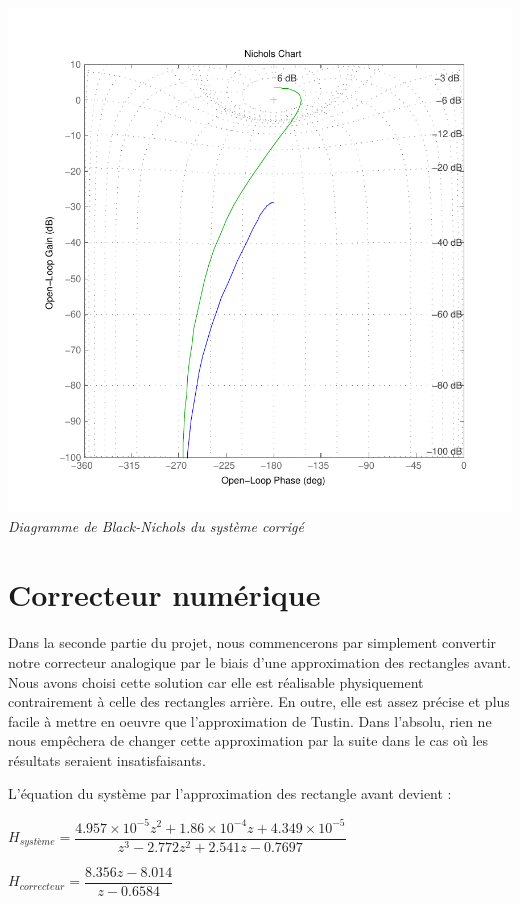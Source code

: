 \documentclass[11pt, french]{article} %
\begin{document}
\begin{center}
\includegraphics[scale=0.50]{MatBlack.pdf}
\\
\emph{Diagramme de Black-Nichols du système corrigé}
\end{center}

\section{Correcteur numérique}

Dans la seconde partie du projet, nous commencerons par simplement convertir notre correcteur analogique par le biais d'une approximation des rectangles avant. Nous avons choisi cette solution car elle est réalisable physiquement contrairement à celle des rectangles arrière. En outre, elle est assez précise et plus facile à mettre en oeuvre que l'approximation de Tustin. Dans l'absolu, rien ne nous empêchera de changer cette approximation par la suite dans le cas où les résultats seraient insatisfaisants. 

L'équation du système par l'approximation des rectangle avant devient :

$  H_{système} = \dfrac {4.957\times 10^{-5}z^{2} + 1.86\times 10^{-4}z + 4.349\times 10^{-5}} {z^{3} - 2.772z^{2} + 2.541z - 0.7697} $
\medskip

$  H_{correcteur} = \dfrac {8.356z - 8.014} {z - 0.6584} $
\medskip
 
\end{document}
